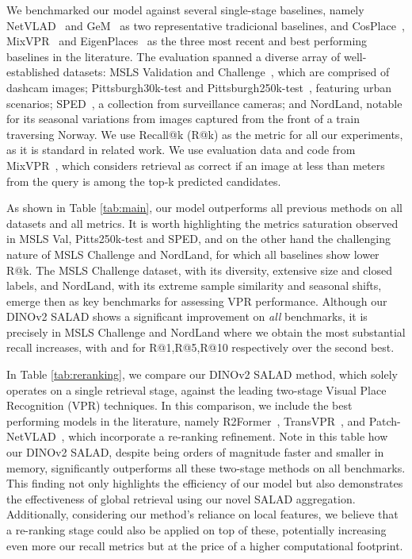 \documentclass[10pt,twocolumn,letterpaper]{article}
\begin{document}
We benchmarked our model against several single-stage baselines, namely NetVLAD~\cite{arandjelovic2016netvlad} and GeM~\cite{radenovic2018fine} as two representative tradicional baselines, and CosPlace~\cite{berton2022rethinking}, MixVPR~\cite{ali2023mixvpr} and EigenPlaces~\cite{berton2023eigenplaces} as the three most recent and best performing baselines in the literature. The evaluation spanned a diverse array of well-established datasets: MSLS Validation and Challenge~\cite{warburg2020mapillary}, which are comprised of dashcam images; Pittsburgh30k-test and Pittsburgh250k-test~\cite{torii2013visual}, featuring urban scenarios; SPED~\cite{chen2018learning}, a collection from surveillance cameras; and NordLand, notable for its seasonal variations from images captured from the front of a train traversing Norway. We use Recall@k (R@k) as the metric for all our experiments, as it is standard in related work. We use evaluation data and code from MixVPR~\cite{ali2023mixvpr}, which considers retrieval as correct if an image at less than  meters from the query is among the top-k predicted candidates.

As shown in Table \ref{tab:main}, our model outperforms all previous methods on all datasets and all metrics. It is worth highlighting the metrics saturation observed in MSLS Val, Pitts250k-test and SPED, and on the other hand the challenging nature of MSLS Challenge and NordLand, for which all baselines show lower R@k. The MSLS Challenge dataset, with its diversity, extensive size and closed labels, and NordLand, with its extreme sample similarity and seasonal shifts, emerge then as key benchmarks for assessing VPR performance. Although our DINOv2 SALAD shows a significant improvement on \textit{all} benchmarks, it is precisely in MSLS Challenge and NordLand where we obtain the most substantial recall increases, with  and  for R@1,R@5,R@10 respectively over the second best.

In Table \ref{tab:reranking}, we compare our DINOv2 SALAD method, which solely operates on a single retrieval stage, against the leading two-stage Visual Place Recognition (VPR) techniques. In this comparison, we include the best performing models in the literature, namely R2Former~\cite{zhu2023r2former}, TransVPR~\cite{wang2022transvpr}, and Patch-NetVLAD~\cite{hausler2021patch}, which incorporate a re-ranking refinement. 
Note in this table how our DINOv2 SALAD, despite being orders of magnitude faster and smaller in memory, significantly outperforms all these two-stage methods on all benchmarks. This finding not only highlights the efficiency of our model but also demonstrates the effectiveness of global retrieval using our novel SALAD aggregation. Additionally, considering our method's reliance on local features, we believe that a re-ranking stage could also be applied on top of these, potentially increasing even more our recall metrics but at the price of a higher computational footprint.
\end{document}
